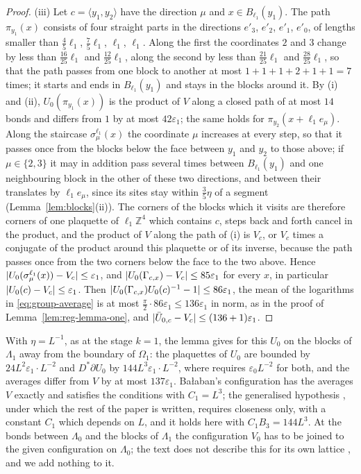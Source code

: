 \documentclass[11pt]{preprint}
\DeclarePairedDelimiter{\abs}{\lvert}{\rvert}
\numberwithin{equation}{section}
\theoremstyle{definition}
\theoremstyle{remark}
\theoremstyle{plain}
\begin{document}
\begin{proof}
(iii) Let $c = \langle y_1, y_2\rangle$ have the direction $\mu$ and $x \in B_{\ell_1}(y_1)$. The path $\pi_{y_1}(x)$ consists of four straight parts in the directions $e'_3$, $e'_2$, $e'_1$, $e'_0$, of lengths smaller than $\frac45\ell_1$, $\frac75\ell_1$, $\ell_1$, $\ell_1$. Along the first the coordinates $2$ and $3$ change by less than $\frac{16}{25}\ell_1$ and $\frac{12}{25}\ell_1$, along the second by less than $\frac{21}{25}\ell_1$ and $\frac{28}{25}\ell_1$, so that the path passes from one block to another at most $1 + 1 + 1 + 2 + 1 + 1 = 7$ times; it starts and ends in $B_{\ell_1}(y_1)$ and stays in the blocks around it. By (i) and (ii), $U_0(\pi_{y_1}(x))$ is the product of $V$ along a closed path of at most $14$ bonds and differs from $1$ by at most $42\varepsilon_1$; the same holds for $\pi_{y_2}(x + \ell_1e_\mu)$. Along the staircase $\sigma^{\ell_1}_\mu(x)$ the coordinate $\mu$ increases at every step, so that it passes once from the blocks below the face between $y_1$ and $y_2$ to those above; if $\mu \in \{ 2, 3 \}$ it may in addition pass several times between $B_{\ell_1}(y_1)$ and one neighbouring block in the other of these two directions, and between their translates by $\ell_1e_\mu$, since its sites stay within $\frac35\eta$ of a segment (Lemma~\ref{lem:blocks}(ii)). The corners of the blocks which it visits are therefore corners of one plaquette of $\ell_1\mathbb Z^4$ which contains $c$, steps back and forth cancel in the product, and the product of $V$ along the path of (i) is $V_c$, or $V_c$ times a conjugate of the product around this plaquette or of its inverse, because the path passes once from the two corners below the face to the two above. Hence $\abs{U_0(\sigma^{\ell_1}_\mu(x)) - V_c} \leq \varepsilon_1$, and $\abs{U_0(\Gamma_{c,x}) - V_c} \leq 85\varepsilon_1$ for every $x$, in particular $\abs{U_0(c) - V_c} \leq \varepsilon_1$. Then $\abs{U_0(\Gamma_{c,x})U_0(c)^{-1} - 1} \leq 86\varepsilon_1$, the mean of the logarithms in \eqref{eq:group-average} is at most $\frac\pi2 \cdot 86\varepsilon_1 \leq 136\varepsilon_1$ in norm, as in the proof of Lemma~\ref{lem:reg-lemma-one}, and $\abs{\bar U_{0,c} - V_c} \leq (136 + 1)\varepsilon_1$.
\end{proof}

With $\eta = L^{-1}$, as at the stage $k = 1$, the lemma gives \cite[(14)]{BalabanVAR} for this $U_0$ on the blocks of $\Lambda_1$ away from the boundary of $\Omega_1$: the plaquettes of $U_0$ are bounded by $24L^2\varepsilon_1 \cdot L^{-2}$ and $D^*\partial U_0$ by $144L^3\varepsilon_1 \cdot L^{-2}$, where \cite[(2)]{BalabanVAR} requires $\varepsilon_0L^{-2}$ for both, and the averages differ from $V$ by at most $137\varepsilon_1$. Ba{\l}aban's configuration has the averages $V$ exactly and satisfies the conditions with $C_1 = L^3$; the generalised hypothesis \cite[(14)]{BalabanVAR}, under which the rest of the paper is written, requires closeness only, with a constant $C_1$ which depends on $L$, and it holds here with $C_1B_3 = 144L^3$. At the bonds between $\Lambda_0$ and the blocks of $\Lambda_1$ the configuration $V_0$ has to be joined to the given configuration on $\Lambda_0$; the text does not describe this for its own lattice \cite[p.~279]{BalabanVAR}, and we add nothing to it.
\end{document}
